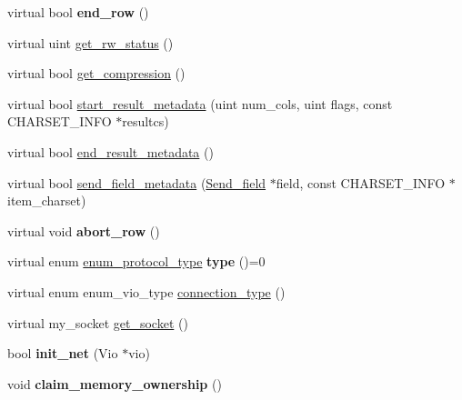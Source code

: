 \begin{DoxyCompactItemize}
\mbox{\label{classProtocol__classic_a9bb1a7b22bb1f04b02d22e04d0b8c6e9}} 
virtual bool {\bfseries end\+\_\+row} ()
\item 
virtual uint \mbox{\hyperlink{classProtocol__classic_aecc686ca92164845b33a39683eb7ac2b}{get\+\_\+rw\+\_\+status}} ()
\item 
virtual bool \mbox{\hyperlink{classProtocol__classic_a1047a7e461d69ff592d8cabe9d89fbe2}{get\+\_\+compression}} ()
\item 
virtual bool \mbox{\hyperlink{classProtocol__classic_a9685e817c254cdb457e9b7932e610259}{start\+\_\+result\+\_\+metadata}} (uint num\+\_\+cols, uint flags, const C\+H\+A\+R\+S\+E\+T\+\_\+\+I\+N\+FO $\ast$resultcs)
\item 
virtual bool \mbox{\hyperlink{classProtocol__classic_a1183e18916adea57032a957a99aaee4b}{end\+\_\+result\+\_\+metadata}} ()
\item 
virtual bool \mbox{\hyperlink{classProtocol__classic_af37f17c0d8853dd2b308bf14826e637c}{send\+\_\+field\+\_\+metadata}} (\mbox{\hyperlink{classSend__field}{Send\+\_\+field}} $\ast$field, const C\+H\+A\+R\+S\+E\+T\+\_\+\+I\+N\+FO $\ast$item\+\_\+charset)
\item 
\mbox{\label{classProtocol__classic_ab7a9ebec5259d7ef3057561568ab6dc8}} 
virtual void {\bfseries abort\+\_\+row} ()
\item 
\mbox{\label{classProtocol__classic_a7af5b3f9171b07be0f956b698c2ac190}} 
virtual enum \mbox{\hyperlink{classProtocol_ab1d147a8122f4ea4f8516ee23c514b02}{enum\+\_\+protocol\+\_\+type}} {\bfseries type} ()=0
\item 
virtual enum enum\+\_\+vio\+\_\+type \mbox{\hyperlink{classProtocol__classic_a7bcc8842c0d81b340310e10a0ec77f4b}{connection\+\_\+type}} ()
\item 
virtual my\+\_\+socket \mbox{\hyperlink{classProtocol__classic_a9b4fba5d75897af15422ed48eb95db8d}{get\+\_\+socket}} ()
\item 
\mbox{\label{classProtocol__classic_a91aa34b3453fb6ddeb8e8a177408363b}} 
bool {\bfseries init\+\_\+net} (Vio $\ast$vio)
\item 
\mbox{\label{classProtocol__classic_a4150076a4371fb97d0c0d7525d7fb857}} 
void {\bfseries claim\+\_\+memory\+\_\+ownership} ()

\end{DoxyCompactItemize}
